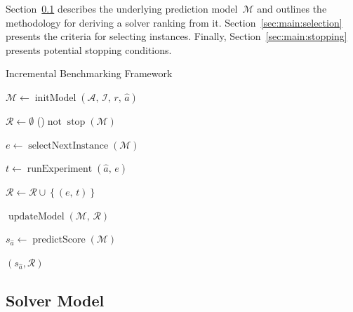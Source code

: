 \documentclass[sn-basic, Numbered]{sn-jnl} %
\begin{document}
Section~\ref{sec:main:model} describes the underlying prediction model~$\mathcal{M}$ and outlines the methodology for deriving a solver ranking from it.
Section~\ref{sec:main:selection} presents the criteria for selecting instances.
Finally, Section~\ref{sec:main:stopping} presents potential stopping conditions.

\begin{algorithm}[t]
  \caption{Incremental Benchmarking Framework}
  \label{algALBenchmark}


  \BlankLine

  $\mathcal{M} \leftarrow \operatorname{initModel}\left(\mathcal{A},\, \mathcal{I},\, r,\, \hat{a}\right)$ 
  
  \BlankLine
  $\mathcal{R} \leftarrow \emptyset$ \;
  \While(){$\operatorname{not} \operatorname{stop}\left(\mathcal{M}\right)$}{
    $e \leftarrow \operatorname{selectNextInstance}\left(\mathcal{M}\right)$ 

    $t \leftarrow \operatorname{runExperiment}\left(\hat{a},\,  e\right)$  

    $\mathcal{R} \leftarrow \mathcal{R} \cup \left\lbrace (e,\, t) \right\rbrace$

    \BlankLine
    $\operatorname{updateModel}\left(\mathcal{M},\, \mathcal{R}\right)$ 
  }
  $s_{\hat a} \leftarrow \operatorname{predictScore}(\mathcal{M})$ 
  
  \BlankLine
  \Return $(s_{\hat a}, \mathcal{R})$
\end{algorithm}


\subsection{Solver Model}
\label{sec:main:model}
\end{document}
